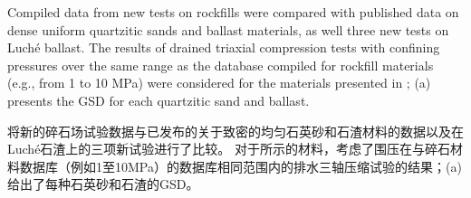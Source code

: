 \begin{ParaColumn}

    Compiled data from new tests on rockfills were compared with published data on dense uniform quartzitic sands and ballast materials, as well three new tests on Luché ballast. The results of drained triaxial compression tests with confining pressures over the same range as the database compiled for rockfill materials (e.g., from 1 to 10 MPa) were considered for the materials presented in ; (a) presents the GSD for each quartzitic sand and ballast.

    \switchcolumn

    将新的碎石场试验数据与已发布的关于致密的均匀石英砂和石渣材料的数据以及在Luché石渣上的三项新试验进行了比较。 对于所示的材料，考虑了围压在与碎石材料数据库（例如1至10MPa）的数据库相同范围内的排水三轴压缩试验的结果；(a)给出了每种石英砂和石渣的GSD。

    \CrossColumnText{
        
    }

\end{ParaColumn}